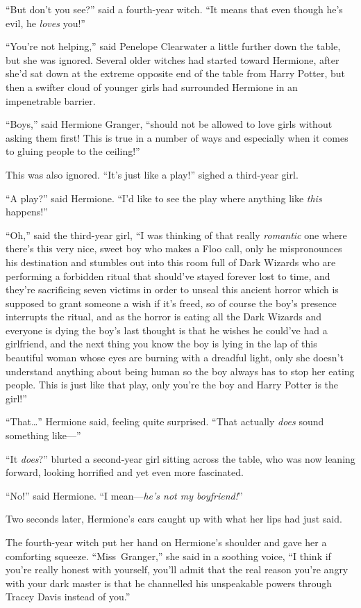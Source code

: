 “But don’t you see?” said a fourth-year witch.
“It means that even though he’s evil, he \emph{loves} you!”

“You’re not helping,” said Penelope Clearwater a little further down the table, but she was ignored. Several older witches had started toward Hermione, after she’d sat down at the extreme opposite end of the table from Harry Potter, but then a swifter cloud of younger girls had surrounded Hermione in an impenetrable barrier.

“Boys,” said Hermione Granger, “should not be allowed to love girls without asking them first! This is true in a number of ways and especially when it comes to gluing people to the ceiling!”

This was also ignored.
“It’s just like a play!” sighed a third-year girl.

“A play?” said Hermione.
“I’d like to see the play where anything like \emph{this} happens!”

“Oh,” said the third-year girl,
“I was thinking of that really \emph{romantic} one where there’s this very nice, sweet boy who makes a Floo call, only he mispronounces his destination and stumbles out into this room full of Dark Wizards who are performing a forbidden ritual that should’ve stayed forever lost to time, and they’re sacrificing seven victims in order to unseal this ancient horror which is supposed to grant someone a wish if it’s freed, so of course the boy’s presence interrupts the ritual, and as the horror is eating all the Dark Wizards and everyone is dying the boy’s last thought is that he wishes he could’ve had a girlfriend, and the next thing you know the boy is lying in the lap of this beautiful woman whose eyes are burning with a dreadful light, only she doesn’t understand anything about being human so the boy always has to stop her eating people. This is just like that play, only you’re the boy and Harry Potter is the girl!”

“That…” Hermione said, feeling quite surprised.
“That actually \emph{does} sound something like—”

“It \emph{does}?” blurted a second-year girl sitting across the table, who was now leaning forward, looking horrified and yet even more fascinated.

“No!” said Hermione.
“I mean—\emph{he’s not my boyfriend!}”

Two seconds later, Hermione’s ears caught up with what her lips had just said.

The fourth-year witch put her hand on Hermione’s shoulder and gave her a comforting squeeze.
“Miss~Granger,” she said in a soothing voice,
“I think if you’re really honest with yourself, you’ll admit that the real reason you’re angry with your dark master is that he channelled his unspeakable powers through Tracey Davis instead of you.”

